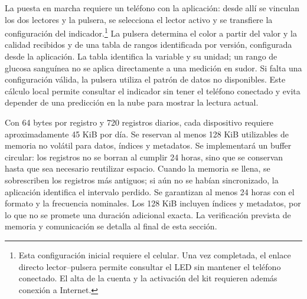 La puesta en marcha requiere un teléfono con la aplicación: desde allí se vinculan los dos lectores y la pulsera, se selecciona el lector activo y se transfiere la configuración del indicador.\footnote{Esta configuración inicial requiere el celular. Una vez completada, el enlace directo lector--pulsera permite consultar el LED sin mantener el teléfono conectado. El alta de la cuenta y la activación del kit requieren además conexión a Internet.} La pulsera determina el color a partir del valor y la calidad recibidos y de una tabla de rangos identificada por versión, configurada desde la aplicación. La tabla identifica la variable y su unidad; un rango de glucosa sanguínea no se aplica directamente a una medición en sudor. Si falta una configuración válida, la pulsera utiliza el patrón de datos no disponibles. Este cálculo local permite consultar el indicador sin tener el teléfono conectado y evita depender de una predicción en la nube para mostrar la lectura actual.

Con 64 bytes por registro y 720 registros diarios, cada dispositivo requiere aproximadamente 45 KiB por día. Se reservan al menos 128 KiB utilizables de memoria no volátil para datos, índices y metadatos. Se implementará un buffer circular: los registros no se borran al cumplir 24 horas, sino que se conservan hasta que sea necesario reutilizar espacio. Cuando la memoria se llena, se sobrescriben los registros más antiguos; si aún no se habían sincronizado, la aplicación identifica el intervalo perdido. Se garantizan al menos 24 horas con el formato y la frecuencia nominales. Los 128 KiB incluyen índices y metadatos, por lo que no se promete una duración adicional exacta. La verificación prevista de memoria y comunicación se detalla al final de esta sección.

